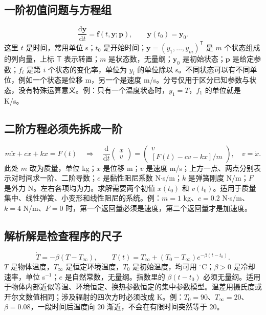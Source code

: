 \documentclass[UTF8,zihao=-4,openany,oneside,fontset=windows]{ctexbook}
\begin{document}
\subsection{一阶初值问题与方程组}
\begin{equation}
\frac{\mathrm d\boldsymbol y}{\mathrm dt}=\boldsymbol f(t,\boldsymbol y;\boldsymbol p),\qquad \boldsymbol y(t_0)=\boldsymbol y_0.
\end{equation}
这里 $t$ 是时间，常用单位 s；$t_0$ 是开始时间；$\boldsymbol y=(y_1,\ldots,y_m)^{\mathsf T}$ 是 $m$ 个状态组成的列向量，上标 $\mathsf T$ 表示转置；$m$ 是状态数，无量纲；$\boldsymbol y_0$ 是初始状态；$\boldsymbol p$ 是给定参数；$f_i$ 是第 $i$ 个状态的变化率，单位为 $y_i$ 的单位除以 s。不同状态可以有不同单位，例如一个状态是位移 m，另一个是速度 m/s。分号仅用于区分已知参数与状态，没有特殊运算意义。例：只有一个温度状态时，$y_1=T$，$f_1$ 的单位就是 K/s。

\subsection{二阶方程必须先拆成一阶}
\begin{equation}
m\ddot x+c\dot x+kx=F(t)\quad\Longrightarrow\quad
\frac{\mathrm d}{\mathrm dt}\begin{pmatrix}x\\v\end{pmatrix}
=\begin{pmatrix}v\\ {}[F(t)-cv-kx]/m\end{pmatrix},\quad v=\dot x.
\end{equation}
此处 $m$ 改为质量，单位 kg；$x$ 是位移 m；$v$ 是速度 m/s；上方一点、两点分别表示对时间求一阶、二阶导数；$c$ 是黏性阻尼系数 N$\cdot$s/m；$k$ 是弹簧刚度 N/m；$F$ 是外力 N。左右各项均为力。求解需要两个初值 $x(t_0)$ 和 $v(t_0)$。适用于质量集中、线性弹簧、小变形和线性阻尼的系统。例：$m=1$ kg、$c=0.2$ N$\cdot$s/m、$k=4$ N/m、$F=0$ 时，第一个返回量必须是速度，第二个返回量才是加速度。

\subsection{解析解是检查程序的尺子}
\begin{equation}
\dot T=-\beta(T-T_\infty),\qquad
T(t)=T_\infty+(T_0-T_\infty)e^{-\beta(t-t_0)}.
\end{equation}
$T$ 是物体温度，$T_\infty$ 是恒定环境温度，$T_0$ 是初始温度，均可用 $^\circ$C；$\beta>0$ 是冷却速率，单位 s$^{-1}$；$e$ 是自然常数，无量纲。指数里的 $\beta(t-t_0)$ 必须无量纲。适用于物体内部近似等温、环境恒定、换热参数恒定的集中参数模型。温差用摄氏度或开尔文数值相同；涉及辐射的四次方时必须改成 K。例：$T_0=90$、$T_\infty=20$、$\beta=0.08$，一段时间后温度向 20 渐近，不会在有限时间突然等于 20。
\end{document}
